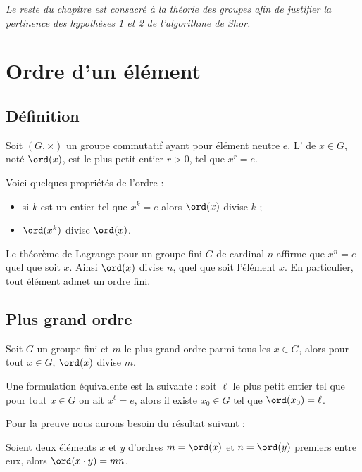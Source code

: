 \documentclass[11pt,class=report,crop=false]{standalone}
\begin{document}
\bigskip

\emph{Le reste du chapitre est consacré à la théorie des groupes afin de justifier la pertinence des hypothèses 1 et 2 de l'algorithme de Shor.}

\section{Ordre d'un élément}


\subsection{Définition}

Soit $(G,\times)$ un groupe commutatif ayant pour élément neutre $e$.
L' de $x \in G$, noté $\ord(x)$, est le plus petit entier $r>0$, tel que $x^r = e$.

Voici quelques propriétés de l'ordre :
\begin{itemize}
  \item si $k$ est un entier tel que $x^k = e$ alors $\ord(x)$ divise $k$ ;
  \item $\ord(x^k)$ divise $\ord(x)$.
\end{itemize}

Le théorème de Lagrange pour un groupe fini $G$ de cardinal $n$ affirme que $x^n=e$ quel que soit $x$. Ainsi $\ord(x)$ divise $n$, quel que soit l'élément $x$. En particulier, tout élément admet un ordre fini.

\subsection{Plus grand ordre}

\begin{proposition}
\label{prop:maxordre}
Soit $G$ un groupe fini et $m$ le plus grand ordre parmi tous les $x \in G$,
alors pour tout $x\in G$, $\ord(x)$ divise $m$.
\end{proposition}

Une formulation équivalente est la suivante : soit $\ell$ le plus petit entier tel que pour tout $x\in G$ on ait $x^\ell = e$, alors il existe $x_0 \in G$ tel que $\ord(x_0)=\ell$.

Pour la preuve nous aurons besoin du résultat suivant :
\begin{lemme}
\label{lem:ordre}
Soient deux éléments $x$ et $y$ d'ordres $m=\ord(x)$ et $n=\ord(y)$ premiers entre eux, alors $\ord(x\cdot y) = m n$.
\end{lemme}
\end{document}
